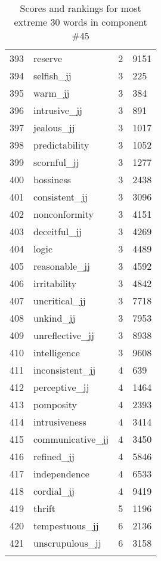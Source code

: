 \begin{longtable}[!htbp]{| rlr@{.}l |}
    393 & reserve & 2 & 9151 \\
    394 & selfish\_jj & 3 & 225 \\
    395 & warm\_jj & 3 & 384 \\
    396 & intrusive\_jj & 3 & 891 \\
    397 & jealous\_jj & 3 & 1017 \\
    398 & predictability & 3 & 1052 \\
    399 & scornful\_jj & 3 & 1277 \\
    400 & bossiness & 3 & 2438 \\
    401 & consistent\_jj & 3 & 3096 \\
    402 & nonconformity & 3 & 4151 \\
    403 & deceitful\_jj & 3 & 4269 \\
    404 & logic & 3 & 4489 \\
    405 & reasonable\_jj & 3 & 4592 \\
    406 & irritability & 3 & 4842 \\
    407 & uncritical\_jj & 3 & 7718 \\
    408 & unkind\_jj & 3 & 7953 \\
    409 & unreflective\_jj & 3 & 8938 \\
    410 & intelligence & 3 & 9608 \\
    411 & inconsistent\_jj & 4 & 639 \\
    412 & perceptive\_jj & 4 & 1464 \\
    413 & pomposity & 4 & 2393 \\
    414 & intrusiveness & 4 & 3414 \\
    415 & communicative\_jj & 4 & 3450 \\
    416 & refined\_jj & 4 & 5846 \\
    417 & independence & 4 & 6533 \\
    418 & cordial\_jj & 4 & 9419 \\
    419 & thrift & 5 & 1196 \\
    420 & tempestuous\_jj & 6 & 2136 \\
    421 & unscrupulous\_jj & 6 & 3158 \\
    \hline
    \caption{Scores and rankings for most extreme 30 words in component \#45} \\
\end{longtable}
